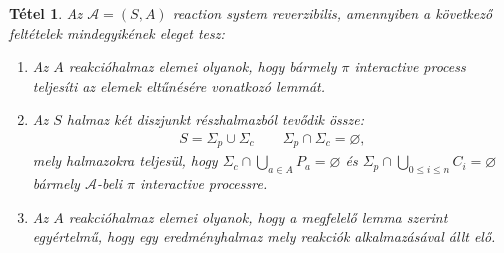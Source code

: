 \documentclass[12pt]{article}
\theoremstyle{definition}
\theoremstyle{remark}
\theoremstyle{plain}
\newtheorem*{theorem*}{Tétel}
\theoremstyle{plain}
\let\emptyset\varnothing
\begin{document}
    \begin{theorem*}
        Az $\mathscr{A} = (S, A)$ \textit{reaction system} reverzibilis, amennyiben a következő feltételek mindegyikének eleget tesz:
        \begin{enumerate}[label={(\arabic*)}]
            \item
            Az $A$ reakcióhalmaz elemei olyanok, hogy bármely $\pi$ \textit{interactive process} teljesíti az elemek eltűnésére vonatkozó lemmát.

            \item
            Az $S$ halmaz két diszjunkt részhalmazból tevődik össze:
            \begin{align*}
                S = \Sigma_{p} \cup \Sigma_{c} \qquad \Sigma_{p} \cap \Sigma_{c} = \emptyset,
            \end{align*}
            mely halmazokra teljesül, hogy $\Sigma_{c} \cap \bigcup_{a \in A} P_{a} = \emptyset$ és $\Sigma_{p} \cap \bigcup_{0 \leq i \leq n} C_{i} = \emptyset$ bármely $\mathscr{A}$-beli $\pi$ \textit{interactive processre}.

            \item
            Az $A$ reakcióhalmaz elemei olyanok, hogy a megfelelő lemma szerint egyértelmű, hogy egy eredményhalmaz mely reakciók alkalmazásával állt elő.
        \end{enumerate}
    \end{theorem*}
\end{document}

